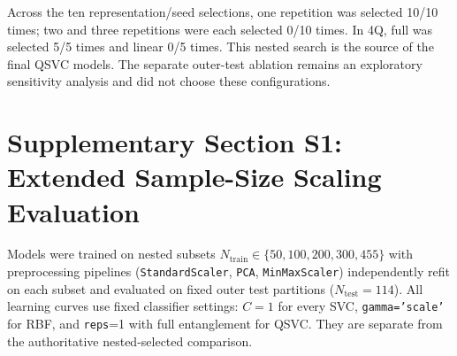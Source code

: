 \documentclass[12pt,a4paper]{article}
\begin{document}
Across the ten representation/seed selections, one repetition was selected 10/10 times; two and three repetitions were each selected 0/10 times. In 4Q, full was selected 5/5 times and linear 0/5 times. This nested search is the source of the final QSVC models. The separate outer-test ablation remains an exploratory sensitivity analysis and did not choose these configurations.

\section*{Supplementary Section S1:\\Extended Sample-Size Scaling Evaluation}

Models were trained on nested subsets $N_{\text{train}} \in \{50, 100, 200, 300, 455\}$ with preprocessing pipelines (\texttt{StandardScaler}, \texttt{PCA}, \texttt{MinMaxScaler}) independently refit on each subset and evaluated on fixed outer test partitions ($N_{\text{test}}=114$). All learning curves use fixed classifier settings: $C=1$ for every SVC, \texttt{gamma='scale'} for RBF, and \texttt{reps}=1 with full entanglement for QSVC. They are separate from the authoritative nested-selected comparison.
\end{document}
